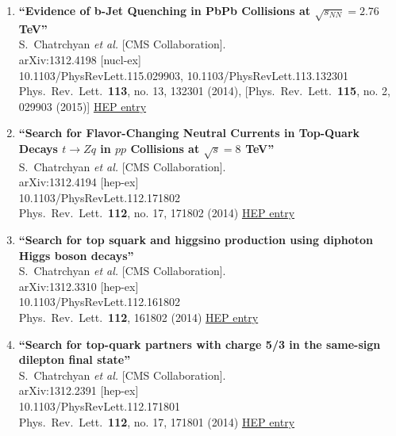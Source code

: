 \documentclass{article}
\begin{document}
\begin{enumerate}
\item%
{\bf ``Evidence of b-Jet Quenching in PbPb Collisions at $\sqrt{s_{NN}}=2.76$  TeV''}
  \\{}S.~Chatrchyan {\it et al.} [CMS Collaboration].
  \\{}arXiv:1312.4198 [nucl-ex]
    \\{}10.1103/PhysRevLett.115.029903, 10.1103/PhysRevLett.113.132301
\\{}Phys.\ Rev.\ Lett.\  {\bf 113}, no. 13, 132301 (2014), [Phys.\ Rev.\ Lett.\  {\bf 115}, no. 2, 029903 (2015)] %
\href{http://inspirehep.net/record/1269454}{HEP entry}


\item%
{\bf ``Search for Flavor-Changing Neutral Currents in Top-Quark Decays $t \to Zq$ in $pp$ Collisions at $\sqrt{s}=8$  TeV''}
  \\{}S.~Chatrchyan {\it et al.} [CMS Collaboration].
  \\{}arXiv:1312.4194 [hep-ex]
    \\{}10.1103/PhysRevLett.112.171802
\\{}Phys.\ Rev.\ Lett.\  {\bf 112}, no. 17, 171802 (2014) %
\href{http://inspirehep.net/record/1269437}{HEP entry}


\item%
{\bf ``Search for top squark and higgsino production using diphoton Higgs boson decays''}
  \\{}S.~Chatrchyan {\it et al.} [CMS Collaboration].
  \\{}arXiv:1312.3310 [hep-ex]
    \\{}10.1103/PhysRevLett.112.161802
\\{}Phys.\ Rev.\ Lett.\  {\bf 112}, 161802 (2014) %
\href{http://inspirehep.net/record/1268812}{HEP entry}


\item%
{\bf ``Search for top-quark partners with charge 5/3 in the same-sign dilepton final state''}
  \\{}S.~Chatrchyan {\it et al.} [CMS Collaboration].
  \\{}arXiv:1312.2391 [hep-ex]
    \\{}10.1103/PhysRevLett.112.171801
\\{}Phys.\ Rev.\ Lett.\  {\bf 112}, no. 17, 171801 (2014) %
\href{http://inspirehep.net/record/1268328}{HEP entry}



\end{enumerate}
\end{document}
